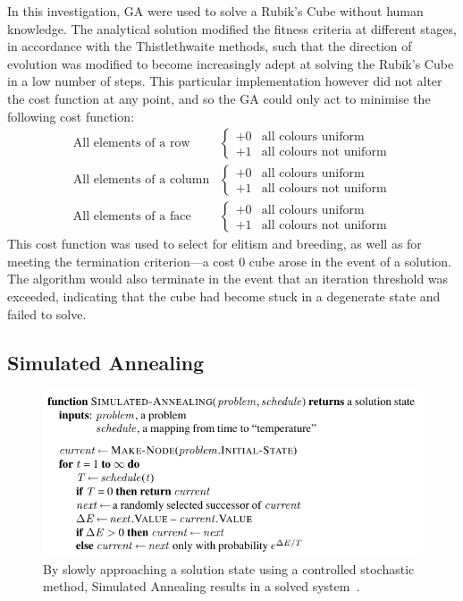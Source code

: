 \documentclass[UKenglish]{libraries/svproc}
\begin{document}
In this investigation, GA were used to solve a Rubik's Cube without human knowledge. The analytical solution modified the fitness criteria at different stages, in accordance with the Thistlethwaite methods, such that the direction of evolution was modified to become increasingly adept at solving the Rubik's Cube in a low number of steps.  This particular implementation however did not alter the cost function at any point, and so the GA could only act to minimise the following cost function:
\begin{align*}
  \text{All elements of a row} &
  \begin{cases}
    +0 & \text{all colours uniform} \\
    +1 & \text{all colours not uniform}
  \end{cases} \\
  \text{All elements of a column} &
  \begin{cases}
    +0 & \text{all colours uniform} \\
    +1 & \text{all colours not uniform}
  \end{cases} \\
  \text{All elements of a face} &
  \begin{cases}
    +0 & \text{all colours uniform} \\
    +1 & \text{all colours not uniform}
  \end{cases}
\end{align*}
This cost function was used to select for elitism and breeding, as well as for meeting the termination criterion---a cost 0 cube arose in the event of a solution. The algorithm would also terminate in the event that an iteration threshold was exceeded, indicating that the cube had become stuck in a degenerate state and failed to solve.

\subsection{Simulated Annealing}

\begin{figure}
\centering
\includegraphics[width=0.9\linewidth]{images/simulated-annealing}
\caption{By slowly approaching a solution state using a controlled stochastic method, Simulated Annealing results in a solved system~\cite{10.5555/1671238}.}
\label{fig:fig1}
\end{figure}
\end{document}
